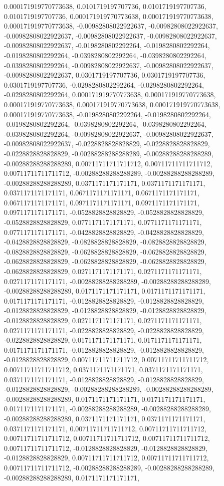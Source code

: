 \documentclass[
  ,man]{apa6}
\begin{document}
0.000171919770773638, 0.0101719197707736, 0.0101719197707736, 0.0101719197707736, 0.000171919770773638, 0.000171919770773638, 0.000171919770773638, -0.00982808022922637, -0.00982808022922637, -0.00982808022922637, -0.00982808022922637, -0.00982808022922637, -0.00982808022922637, -0.0198280802292264, -0.0198280802292264, -0.0198280802292264, -0.0398280802292264, -0.0398280802292264, -0.0398280802292264, -0.00982808022922637, -0.00982808022922637, -0.00982808022922637, 0.0301719197707736, 0.0301719197707736,
0.0301719197707736, -0.0298280802292264, -0.0298280802292264, -0.0298280802292264, 0.000171919770773638, 0.000171919770773638, 0.000171919770773638, 0.000171919770773638, 0.000171919770773638, 0.000171919770773638, -0.0198280802292264, -0.0198280802292264, -0.0198280802292264, -0.0398280802292264, -0.0398280802292264, -0.0398280802292264, -0.00982808022922637, -0.00982808022922637, -0.00982808022922637, -0.0228828828828829, -0.0228828828828829, -0.0228828828828829, -0.00288288288288289, -0.00288288288288289,
-0.00288288288288289, 0.00711711711711712, 0.00711711711711712, 0.00711711711711712, -0.00288288288288289, -0.00288288288288289, -0.00288288288288289, 0.0371171171171171, 0.0371171171171171, 0.0371171171171171, 0.0671171171171171, 0.0671171171171171, 0.0671171171171171, 0.0971171171171171, 0.0971171171171171, 0.0971171171171171, -0.0528828828828829, -0.0528828828828829, -0.0528828828828829, 0.0771171171171171, 0.0771171171171171, 0.0771171171171171, -0.0428828828828829, -0.0428828828828829, -0.0428828828828829,
-0.0828828828828829, -0.0828828828828829, -0.0828828828828829, -0.0628828828828829, -0.0628828828828829, -0.0628828828828829, -0.0628828828828829, -0.0628828828828829, -0.0628828828828829, 0.0271171171171171, 0.0271171171171171, 0.0271171171171171, -0.00288288288288289, -0.00288288288288289, -0.00288288288288289, 0.0171171171171171, 0.0171171171171171, 0.0171171171171171, -0.0128828828828829, -0.0128828828828829, -0.0128828828828829, -0.0128828828828829, -0.0128828828828829, -0.0128828828828829,
0.0271171171171171, 0.0271171171171171, 0.0271171171171171, -0.0228828828828829, -0.0228828828828829, -0.0228828828828829, 0.0171171171171171, 0.0171171171171171, 0.0171171171171171, -0.0128828828828829, -0.0128828828828829, -0.0128828828828829, 0.00711711711711712, 0.00711711711711712, 0.00711711711711712, 0.0371171171171171, 0.0371171171171171, 0.0371171171171171, -0.0128828828828829, -0.0128828828828829, -0.0128828828828829, -0.00288288288288289, -0.00288288288288289, -0.00288288288288289, 0.0171171171171171,
0.0171171171171171, 0.0171171171171171, -0.00288288288288289, -0.00288288288288289, -0.00288288288288289, 0.0371171171171171, 0.0371171171171171, 0.0371171171171171, 0.00711711711711712, 0.00711711711711712, 0.00711711711711712, 0.00711711711711712, 0.00711711711711712, 0.00711711711711712, -0.0128828828828829, -0.0128828828828829, -0.0128828828828829, 0.00711711711711712, 0.00711711711711712, 0.00711711711711712, -0.00288288288288289, -0.00288288288288289, -0.00288288288288289, 0.0171171171171171,
\end{document}
